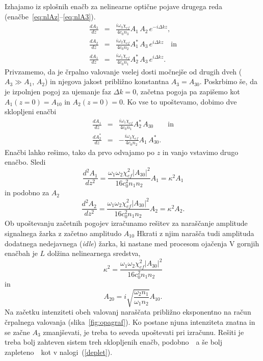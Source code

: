 Izhajamo iz splošnih enačb za nelinearne optične pojave drugega reda 
(enačbe~\ref{eq:nlAz}--\ref{eq:nlA3}). 
\begin{eqnarray}
\frac{dA_{3}}{dz} &=& \frac{i\omega_{3}\chi_{ef}}{4c_0 n_3} A_{1}\, A_{2}\, e^{-i\Delta kz}, \\
\frac{dA_{2}}{dz} &=&\frac{i\omega_{2}\chi_{ef}}{4c_0 n_2} A_{1}^*\, A_{3}\, e^{i\Delta kz}\quad \textrm{in}\\
\frac{dA_{1}}{dz} &=&\frac{i\omega_{1}\chi_{ef}}{4c_0 n_1} A_{2}^*\, A_{3}\, e^{i\Delta kz}.
\label{eq:opaA}
\end{eqnarray}
Privzamemo, da je črpalno valovanje vselej dosti močnejše od drugih dveh
($A_{3}\gg A_{1}$, $A_{2}$) in njegova jakost približno konstantna $A_3 = A_{30}$.
Poskrbimo še, da je izpolnjen pogoj za ujemanje faz $\Delta k=0$, 
začetna pogoja pa zapišemo kot $A_{1}(z=0)=A_{10}$ in $A_{2}(z=0)=0$. Ko vse to upoštevamo,
dobimo dve sklopljeni enačbi
\begin{eqnarray}
\frac{dA_{1}}{dz} &=& \frac{i\omega_{1}\chi_{ef}}{4c_0 n_1} A_{2}^*\, A_{30}\label{eq:opaA1} 
\qquad \mathrm{in} \\
\frac{dA_{2}^*}{dz} &=& -\frac{i\omega_{2}\chi_{ef}}{4c_0 n_2} A_{1}\, A_{30}^*.
\label{eq:opaA2}
\end{eqnarray}
Enačbi lahko rešimo, tako da prvo odvajamo po $z$ in vanjo vstavimo drugo enačbo.
Sledi
\begin{equation}
\frac{d^2 A_1}{d z^2} = \frac{\omega_1 \omega_2 \chi_{ef}^2|A_{30}|^2}
{16 c_0^2 n_1 n_2} A_1 = \kappa^2 A_1
\end{equation}
in podobno za $A_2$
\begin{equation}
\frac{d^2 A_2}{d z^2} = \frac{\omega_1 \omega_2 \chi_{ef}^2|A_{30}|^2}
{16 c_0^2 n_1 n_2} A_2 = \kappa^2 A_2.
\end{equation}
Ob upoštevanju začetnih pogojev izračunamo rešitev za naraščanje amplitude signalnega žarka
z začetno amplitudo $A_{10}$
Hkrati z njim narašča tudi amplituda dodatnega nedejavnega ({\it idle}) žarka, ki nastane
med procesom ojačenja
V gornjih enačbah je $L$ dolžina nelinearnega sredstva, 
\begin{equation}
\kappa^2 = \frac{\omega_1 \omega_2 \chi_{ef}^2|A_{30}|^2}
{16 c_0^2 n_1 n_2} 
\label{opakapa}
\end{equation}
in
\begin{equation}
A_{20} = i \sqrt{\frac{\omega_2 n_1}{\omega_1 n_2}} A_{10}.
\label{opakapaA}
\end{equation}
Na začetku intenziteti obeh valovanj naraščata približno eksponentno na račun črpalnega
valovanja (slika~\ref{fig:opagraf}). Ko postane njuna intenziteta znatna in se 
začne $A_3$ zmanjševati, je treba to seveda
upoštevati pri izračunu. Rešiti je treba bolj zahteven sistem treh 
sklopljenih enačb, podobno~\textendash~a še bolj zapleteno~\textendash~kot v nalogi~(\ref{deplet}).

